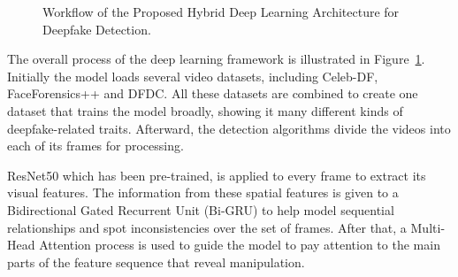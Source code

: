 \documentclass[conference]{IEEEtran}
\begin{document}
\begin{figure}[!ht]
    \centering
    \caption{Workflow of the Proposed Hybrid Deep Learning Architecture for Deepfake Detection.}
    \label{fig:workflow_diagram}
\end{figure}

The overall process of the deep learning framework is illustrated in Figure~\ref{fig:workflow_diagram}. Initially  the model loads several video datasets, including Celeb-DF, FaceForensics++ and DFDC. All these datasets are combined to create one dataset that trains the model broadly, showing it many different kinds of deepfake-related traits. Afterward, the detection algorithms divide the videos into each of its frames for processing.

ResNet50 which has been pre-trained, is applied to every frame to extract its visual features. The information from these spatial features is given to a Bidirectional Gated Recurrent Unit (Bi-GRU) to help model sequential relationships and spot inconsistencies over the set of frames. After that, a Multi-Head Attention process is used to guide the model to pay attention to the main parts of the feature sequence that reveal manipulation.
\end{document}
